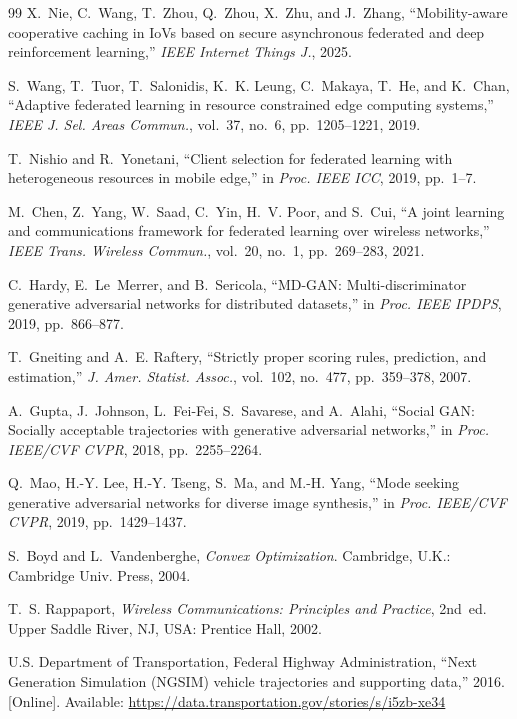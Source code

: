 \documentclass[journal]{IEEEtran}
\begin{document}
\begin{thebibliography}{99}
X.~Nie, C.~Wang, T.~Zhou, Q.~Zhou, X.~Zhu, and J.~Zhang, ``Mobility-aware
cooperative caching in IoVs based on secure asynchronous federated and deep
reinforcement learning,'' \emph{IEEE Internet Things J.}, 2025.

S.~Wang, T.~Tuor, T.~Salonidis, K.~K. Leung, C.~Makaya, T.~He, and K.~Chan,
``Adaptive federated learning in resource constrained edge computing
systems,'' \emph{IEEE J. Sel. Areas Commun.}, vol.~37, no.~6,
pp.~1205--1221, 2019.

T.~Nishio and R.~Yonetani, ``Client selection for federated learning with
heterogeneous resources in mobile edge,'' in \emph{Proc. IEEE ICC}, 2019,
pp.~1--7.

M.~Chen, Z.~Yang, W.~Saad, C.~Yin, H.~V. Poor, and S.~Cui, ``A joint learning
and communications framework for federated learning over wireless networks,''
\emph{IEEE Trans. Wireless Commun.}, vol.~20, no.~1, pp.~269--283, 2021.

C.~Hardy, E.~Le~Merrer, and B.~Sericola, ``MD-GAN: Multi-discriminator
generative adversarial networks for distributed datasets,'' in \emph{Proc.
IEEE IPDPS}, 2019, pp.~866--877.

T.~Gneiting and A.~E. Raftery, ``Strictly proper scoring rules, prediction, and
estimation,'' \emph{J. Amer. Statist. Assoc.}, vol.~102, no.~477,
pp.~359--378, 2007.

A.~Gupta, J.~Johnson, L.~Fei-Fei, S.~Savarese, and A.~Alahi, ``Social GAN:
Socially acceptable trajectories with generative adversarial networks,'' in
\emph{Proc. IEEE/CVF CVPR}, 2018, pp.~2255--2264.

Q.~Mao, H.-Y. Lee, H.-Y. Tseng, S.~Ma, and M.-H. Yang, ``Mode seeking
generative adversarial networks for diverse image synthesis,'' in \emph{Proc.
IEEE/CVF CVPR}, 2019, pp.~1429--1437.

S.~Boyd and L.~Vandenberghe, \emph{Convex Optimization}. Cambridge, U.K.:
Cambridge Univ. Press, 2004.

T.~S. Rappaport, \emph{Wireless Communications: Principles and Practice},
2nd~ed. Upper Saddle River, NJ, USA: Prentice Hall, 2002.

U.S. Department of Transportation, Federal Highway Administration, ``Next
Generation Simulation (NGSIM) vehicle trajectories and supporting data,''
2016. [Online]. Available:
\url{https://data.transportation.gov/stories/s/i5zb-xe34}

\end{thebibliography}
\end{document}
